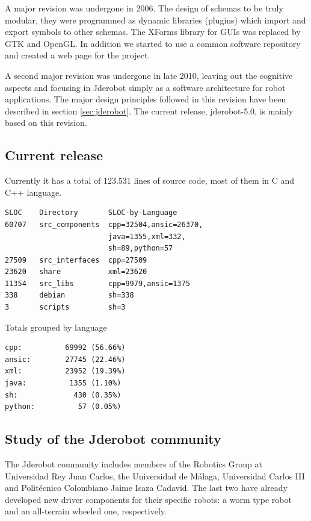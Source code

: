 \documentclass[twocolumn]{svjour3}          %
\begin{document}
A major revision was undergone in 2006. The design of schemas to be truly modular, they were programmed as dynamic libraries (plugins) which import and export symbols to other schemas. The XForms library for GUIs was replaced by GTK and OpenGL. In addition we started to use a common software repository and created a web page for the project. 

A second major revision was undergone in late 2010, leaving out the cognitive aspects and focusing in Jderobot simply as a software architecture for robot applications. The major design principles followed in this revision have been described in section \ref{sec:jderobot}. The current release, jderobot-5.0, is mainly based on this revision.

\subsection{Current release}
Currently it has a total of 123.531 lines of source code, most of them in C and C++ language.

\begin{verbatim}
SLOC    Directory       SLOC-by-Language 
60707   src_components  cpp=32504,ansic=26370,
                        java=1355,xml=332,
                        sh=89,python=57
27509   src_interfaces  cpp=27509
23620   share           xml=23620
11354   src_libs        cpp=9979,ansic=1375
338     debian          sh=338
3       scripts         sh=3
\end{verbatim}

Totals grouped by language
\begin{verbatim}
cpp:          69992 (56.66%)
ansic:        27745 (22.46%)
xml:          23952 (19.39%)
java:          1355 (1.10%)
sh:             430 (0.35%)
python:          57 (0.05%)
\end{verbatim}

\subsection{Study of the Jderobot community}
The Jderobot community includes members of the Robotics Group at Universidad Rey Juan Carlos, the Universidad de Málaga, Universidad Carlos III and Politécnico Colombiano Jaime Isaza Cadavid. The last two have already developed new driver components for their specific robots: a worm type robot and an all-terrain wheeled one, respectively.
\end{document}
